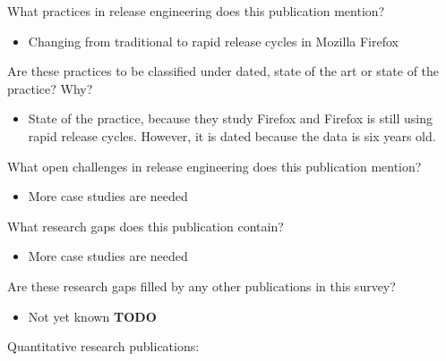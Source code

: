 \documentclass[]{book}
\providecommand{\tightlist}{%
  \setlength{\itemsep}{0pt}\setlength{\parskip}{0pt}}
\begin{document}
What practices in release engineering does this publication mention?

\begin{itemize}
\tightlist
\item
  Changing from traditional to rapid release cycles in Mozilla Firefox
\end{itemize}

Are these practices to be classified under dated, state of the art or
state of the practice? Why?

\begin{itemize}
\tightlist
\item
  State of the practice, because they study Firefox and Firefox is still
  using rapid release cycles. However, it is dated because the data is
  six years old.
\end{itemize}

What open challenges in release engineering does this publication
mention?

\begin{itemize}
\tightlist
\item
  More case studies are needed
\end{itemize}

What research gaps does this publication contain?

\begin{itemize}
\tightlist
\item
  More case studies are needed
\end{itemize}

Are these research gaps filled by any other publications in this survey?

\begin{itemize}
\tightlist
\item
  Not yet known \textbf{TODO}
\end{itemize}

Quantitative research publications:
\end{document}
